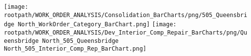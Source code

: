 \texttt{[image: \\rootpath/WORK\_ORDER\_ANALYSIS/Consolidation\_BarCharts/png/505\_Queensbridge North\_WorkOrder\_Category\_BarChart.png]}
\texttt{[image: \\rootpath/WORK\_ORDER\_ANALYSIS/Dev\_Interior\_Comp\_Repair\_BarCharts/png/Queensbridge North\_505\_Queensbridge North\_505\_Interior\_Comp\_Rep\_BarChart.png]}

